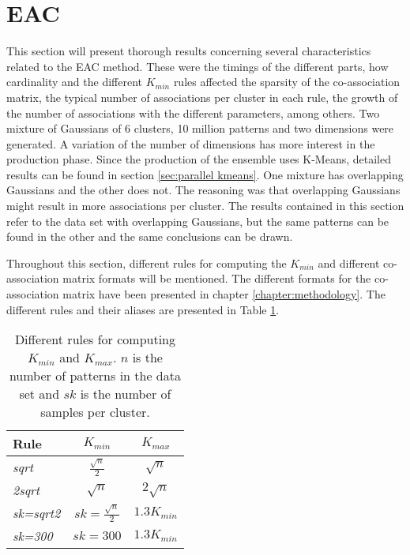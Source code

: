 \section{EAC}
\label{sec:eac results}

This section will present thorough results concerning several characteristics related to the EAC method.
These were the timings of the different parts, how cardinality and the different $K_{min}$ rules affected the sparsity of the co-association matrix, the typical number of associations per cluster in each rule, the growth of the number of associations with the different parameters, among others.
Two mixture of Gaussians of 6 clusters, 10 million patterns and two dimensions were generated.
A variation of the number of dimensions has more interest in the production phase.
Since the production of the ensemble uses K-Means, detailed results can be found in section \ref{sec:parallel kmeans}.
One mixture has overlapping Gaussians and the other does not.
The reasoning was that overlapping Gaussians might result in more associations per cluster.
The results contained in this section refer to the data set with overlapping Gaussians, but the same patterns can be found in the other and the same conclusions can be drawn.

Throughout this section, different rules for computing the $K_{min}$ and different co-association matrix formats will be mentioned.
The different formats for the co-association matrix have been presented in chapter \ref{chapter:methodology}.
The different rules and their aliases are presented in Table \ref{tab:eac rules}.

\begin{table}[h]
\centering
\caption{Different rules for computing $K_{min}$ and $K_{max}$. $n$ is the number of patterns in the data set and $sk$ is the number of samples per cluster.}

\begin{tabular}{lcc}
\toprule
Rule &  $K_{min}$ &  $K_{max}$ \\
\midrule
\emph{sqrt}     & $\frac{\sqrt{n}}{2}$      & $\sqrt{n}$    \\
\emph{2sqrt}    & $\sqrt{n}$                & $2 \sqrt{n}$  \\
\emph{sk=sqrt2} & $sk = \frac{\sqrt{n}}{2}$ & $1.3 K_{min}$ \\
\emph{sk=300}   & $sk = 300$                & $1.3 K_{min}$ \\
\bottomrule
\end{tabular}

\label{tab:eac rules}
\end{table}

